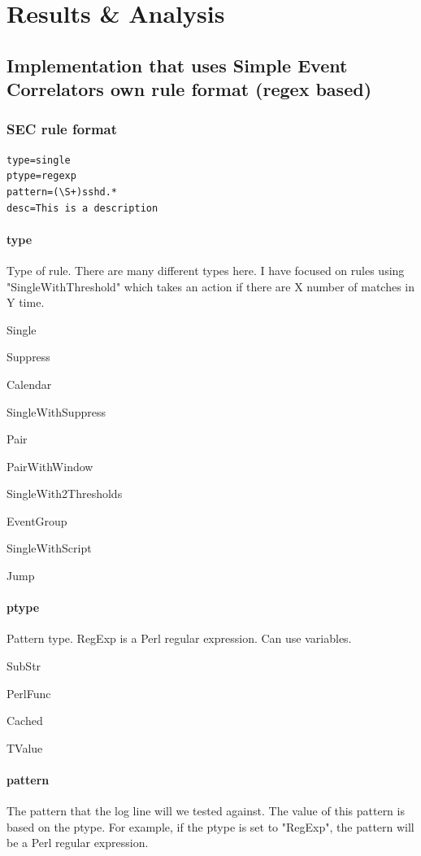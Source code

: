 \chapter{Results {\&} Analysis}
\label{chap:resultsanalysis}

\section{Implementation that uses Simple Event Correlators own rule format (regex based)}

\subsection{SEC rule format}



\begin{lstlisting}
type=single
ptype=regexp
pattern=(\S+)sshd.*
desc=This is a description
\end{lstlisting}

\subsubsection{type}
Type of rule. There are many different types here.
I have focused on rules using "SingleWithThreshold" which takes an action if there are X number of matches in Y time.

Single

Suppress

Calendar

SingleWithSuppress

Pair

PairWithWindow

SingleWith2Thresholds

EventGroup

SingleWithScript

Jump

\subsubsection{ptype}
Pattern type. RegExp is a Perl regular expression. Can use variables.

SubStr

PerlFunc

Cached

TValue

\subsubsection{pattern}
The pattern that the log line will we tested against. The value of this pattern is based on the ptype. For example, if the ptype is set to "RegExp", the pattern will be a Perl regular expression.

